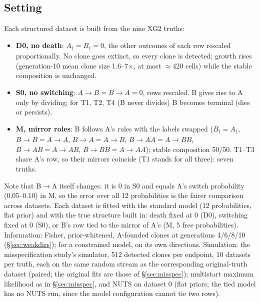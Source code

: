 \documentclass[10pt,a4paper]{article}
\newcommand{\BA}{B$\to$A}
\begin{document}
\subsection{Setting}
Each structured dataset is built from the nine XG2 truths:
\begin{itemize}
\item \textbf{D0, no death}: $A_\dagger = B_\dagger = 0$, the other outcomes of each row rescaled proportionally. No clone goes extinct, so every clone is detected; growth rises (generation-10 mean clone size 1.6--7$\times$, at most $\approx$420 cells) while the stable composition is unchanged.
\item \textbf{S0, no switching}: $A\to B = B\to A = 0$, rows rescaled. B gives rise to A only by dividing; for T1, T2, T4 (B never divides) B becomes terminal (dies or persists).
\item \textbf{M, mirror roles}: B follows A's rules with the labels swapped ($B_\dagger = A_\dagger$, $B\to B = A\to A$, $B\to A = A\to B$, $B\to AA = A\to BB$, $B\to AB = A\to AB$, $B\to BB = A\to AA$); stable composition 50/50. T1--T3 share A's row, so their mirrors coincide (T1 stands for all three): seven truths.
\end{itemize}
Note that \BA{} itself changes: it is 0 in S0 and equals A's switch probability (0.05--0.10) in M, so the error over all 12 probabilities is the fairer comparison across datasets. Each dataset is fitted with the standard model (12 probabilities, flat prior) and with the true structure built in: death fixed at 0 (D0), switching fixed at 0 (S0), or B's row tied to the mirror of A's (M, 5 free probabilities). Information: Fisher, prior-whitened, A-founded clones at generations 4/6/8/10 (\S\ref{sec:weakdirs}); for a constrained model, on its own directions. Simulation: the misspecification study's simulator, 512 detected clones per endpoint, 10 datasets per truth, each on the same random stream as the corresponding original-truth dataset (paired; the original fits are those of \S\ref{sec:misspec}); multistart maximum likelihood as in \S\ref{sec:misspec}, and NUTS on dataset 0 (flat priors; the tied model has no NUTS run, since the model configuration cannot tie two rows).
\end{document}
